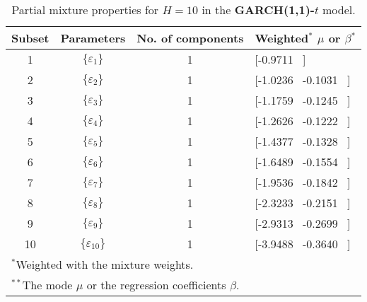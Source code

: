 \footnotesize{  
{ \renewcommand{\arraystretch}{1.3} 
\begin{longtable}{cccp{3.6cm}} 
\caption{Partial mixture properties for $H=10$ in the \textbf{GARCH(1,1)-$t$} model.} 
\label{tab:pmits_t_garch2_noS_ML} \\ 
 Subset & Parameters & No. of components  & Weighted$^{*}$ $\mu$ or $\beta$$^{*}$ \\ \hline 
1 & $\{\varepsilon_{1}\}$ & 1 & [-0.9711 \, ]   \\ [1ex] 
2 & $\{\varepsilon_{2}\}$ & 1 & [-1.0236 \, -0.1031 \, ]   \\ [1ex] 
3 & $\{\varepsilon_{3}\}$ & 1 & [-1.1759 \, -0.1245 \, ]   \\ [1ex] 
4 & $\{\varepsilon_{4}\}$ & 1 & [-1.2626 \, -0.1222 \, ]   \\ [1ex] 
5 & $\{\varepsilon_{5}\}$ & 1 & [-1.4377 \, -0.1328 \, ]   \\ [1ex] 
6 & $\{\varepsilon_{6}\}$ & 1 & [-1.6489 \, -0.1554 \, ]   \\ [1ex] 
7 & $\{\varepsilon_{7}\}$ & 1 & [-1.9536 \, -0.1842 \, ]   \\ [1ex] 
8 & $\{\varepsilon_{8}\}$ & 1 & [-2.3233 \, -0.2151 \, ]   \\ [1ex] 
9 & $\{\varepsilon_{9}\}$ & 1 & [-2.9313 \, -0.2699 \, ]   \\ [1ex] 
10 & $\{\varepsilon_{10}\}$ & 1 & [-3.9488 \, -0.3640 \, ]   \\ [1ex] 
\hline 
 \multicolumn{4}{l}{\footnotesize{$^{*}$Weighted with the mixture weights.}} \\ 
 \multicolumn{4}{l}{\footnotesize{$^{**}$The mode $\mu$ or the regression coefficients $\beta$.}} \\ 
\end{longtable} 
} 
} 
